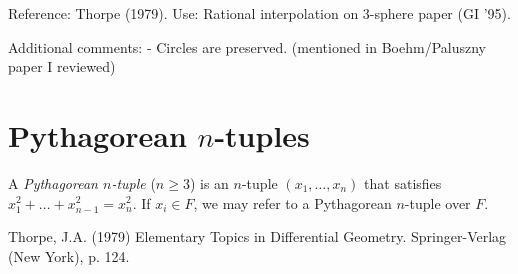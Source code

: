 Reference: Thorpe (1979).
Use: Rational interpolation on 3-sphere paper (GI '95).

Additional comments: 
	- Circles are preserved.  (mentioned in Boehm/Paluszny paper I reviewed)


\section{Pythagorean $n$-tuples}

\begin{defn2}
{\rm 
A {\em Pythagorean $n$-tuple} ($n \geq 3$) is an $n$-tuple 
$(x_1,\ldots,x_n)$ that satisfies\\
$x_1^2 + \ldots + x_{n-1}^2 = x_{n}^2$.
If $x_i \in F$, we may refer to a Pythagorean $n$-tuple over $F$.
}
\end{defn2}



\begin{thebibliography}{Dickson 52}

Thorpe, J.A. (1979) Elementary Topics in Differential Geometry.
Springer-Verlag (New York), p. 124.

\end{thebibliography}


